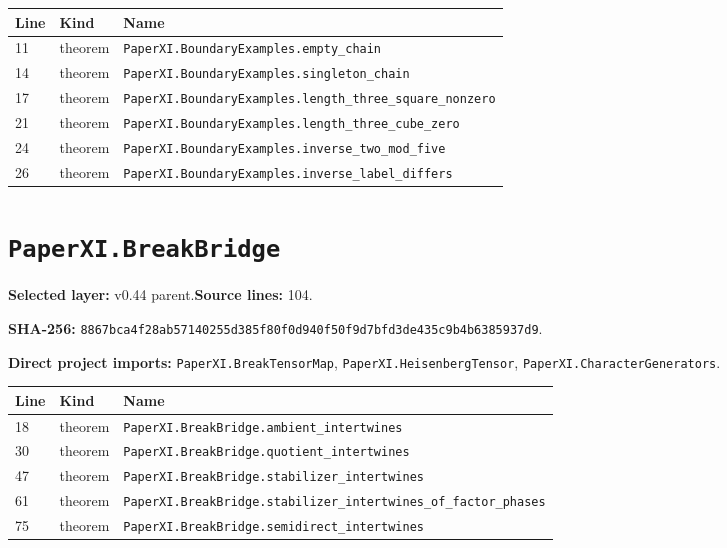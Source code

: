 \documentclass[10pt,oneside]{book}
\begin{document}
\begin{longtable}{@{}p{}p{}p{}@{}}\toprule Line&Kind&Name\\\midrule\endhead

11&theorem&\nolinkurl{PaperXI.BoundaryExamples.empty_chain}\\

14&theorem&\nolinkurl{PaperXI.BoundaryExamples.singleton_chain}\\

17&theorem&\nolinkurl{PaperXI.BoundaryExamples.length_three_square_nonzero}\\

21&theorem&\nolinkurl{PaperXI.BoundaryExamples.length_three_cube_zero}\\

24&theorem&\nolinkurl{PaperXI.BoundaryExamples.inverse_two_mod_five}\\

26&theorem&\nolinkurl{PaperXI.BoundaryExamples.inverse_label_differs}\\

\bottomrule\end{longtable}

\section{\texorpdfstring{\nolinkurl{PaperXI.BreakBridge}}{PaperXI.BreakBridge}}\label{module:PaperXI.BreakBridge}

\textbf{Selected layer:} v0.44 parent.\quad\textbf{Source lines:} 104.\par\textbf{SHA-256:} {\scriptsize\nolinkurl{8867bca4f28ab57140255d385f80f0d940f50f9d7bfd3de435c9b4b6385937d9}}.


\textbf{Direct project imports:} \nolinkurl{PaperXI.BreakTensorMap}, \nolinkurl{PaperXI.HeisenbergTensor}, \nolinkurl{PaperXI.CharacterGenerators}.

\begin{longtable}{@{}p{}p{}p{}@{}}\toprule Line&Kind&Name\\\midrule\endhead

18&theorem&\nolinkurl{PaperXI.BreakBridge.ambient_intertwines}\\

30&theorem&\nolinkurl{PaperXI.BreakBridge.quotient_intertwines}\\

47&theorem&\nolinkurl{PaperXI.BreakBridge.stabilizer_intertwines}\\

61&theorem&\nolinkurl{PaperXI.BreakBridge.stabilizer_intertwines_of_factor_phases}\\

75&theorem&\nolinkurl{PaperXI.BreakBridge.semidirect_intertwines}\\

\bottomrule\end{longtable}
\end{document}
